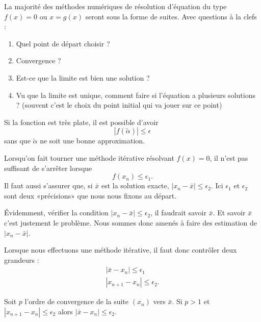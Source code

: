 La majorité des méthodes numériques de résolution d'équation du type \( f(x)=0\) ou \( x=g(x)\) seront sous la forme de suites. Avec questions à la clefs :
\begin{enumerate}
	\item
		Quel point de départ choisir ?
	\item
		Convergence ?
	\item
		Est-ce que la limite est bien une solution ?
	\item
		Vu que la limite est unique, comment faire si l'équation a plusieurs solutions ? (souvent c'est le choix du point initial qui va jouer sur ce point)
\end{enumerate}

\begin{normaltext}
	Si la fonction est très plate, il est possible d'avoir
	\begin{equation}
		| f(\tilde \alpha) |\leq \epsilon
	\end{equation}
	sans que \( \tilde \alpha\) ne soit une bonne approximation.

	Lorsqu'on fait tourner une méthode itérative résolvant \( f(x)=0\), il n'est pas suffisant de s'arrêter lorsque
	\begin{equation}
		f(x_n)\leq \epsilon_1.
	\end{equation}
	Il faut aussi s'assurer que, si \( \bar x\) est la solution exacte, \( | x_n-\bar x |\leq \epsilon_2\). Ici \( \epsilon_1\) et \( \epsilon_2\) sont deux «précisions» que nous nous fixons au départ.

	Évidemment, vérifier la condition \( | x_n-\bar x |\leq \epsilon_2\), il faudrait savoir \( \bar x\). Et savoir \( \bar x\) c'est justement le problème. Nous sommes donc amenés à faire des estimation de \( | x_n-\bar x |\).
\end{normaltext}

\begin{normaltext}
    Lorsque nous effectuons une méthode itérative, il faut donc contrôler deux grandeurs :
    \begin{subequations}
        \begin{align}
            | \bar x-x_n |\leq \epsilon_1\\
            | x_{n+1}-x_n |\leq \epsilon_2.
        \end{align}
    \end{subequations}
\end{normaltext}

\begin{proposition}
Soit \( p\) l'ordre de convergence de la suite \( (x_n)\) vers \( \bar x\). Si \( p>1\) et \( | x_{n+1}-x_n |\leq \epsilon_2\) alors \( | \bar x-x_n |\leq \epsilon_2\).
\end{proposition}

